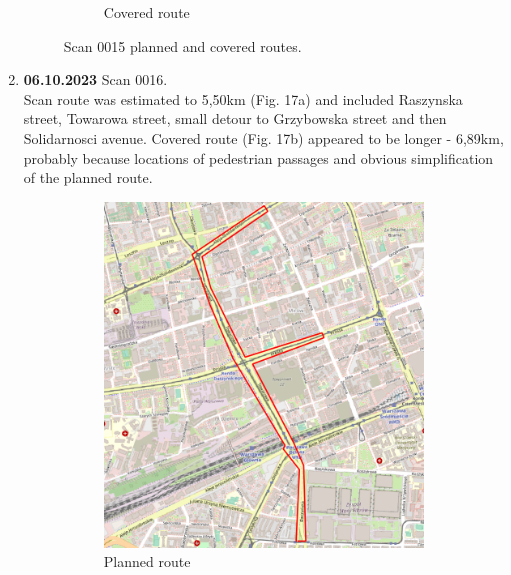 \documentclass[a4paper,12pt]{article}
\begin{document}
\begin{enumerate}
\begin{figure}[H]
\begin{subfigure}{.85\textwidth}
			\caption{Covered route}
			\label{fig:b15}
		\end{subfigure}
		\caption{Scan 0015 planned and covered routes.}
		\label{fig:fig15}
	\end{figure} 
	\pagebreak
	
	\item \textbf{06.10.2023} Scan 0016. \\
	Scan route was estimated to 5,50km (Fig. 17a) and included Raszynska street, Towarowa street, small detour to Grzybowska street and then Solidarnosci avenue. Covered route (Fig. 17b) appeared to be longer - 6,89km, probably because locations of pedestrian passages and obvious simplification of the planned route. 
	\begin{figure}[H]
		\centering
		\begin{subfigure}{.63\textwidth}
			\centering
			\includegraphics[width=1\linewidth]{route_p16}
			\caption{Planned route}
			\label{fig:a16}
		\end{subfigure}%
		\linebreak
		\begin{subfigure}{.63\textwidth}
			\centering

\end{subfigure}
\end{figure}
\end{enumerate}
\end{document}
